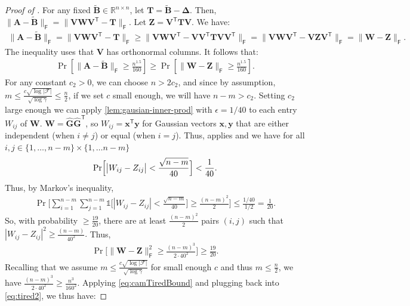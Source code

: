 \documentclass{article}[11pt]
\theoremstyle{definition}
\newcommand{\ones}{\mathds{1}}
\newcommand{\bv}[1]{\boldsymbol{\mathbf{#1}}}
\newcommand{\R}{\mathbb{R}}
\newcommand{\T}{\mathsf{T}}
\newcommand{\Fro}{\mathsf{F}}
\newcommand{\F}{\mathcal{F}}
\begin{document}
\begin{proof}[Proof of ]
For any fixed $\bv{\tilde B} \in \R^{n \times n}$, let $\bv{T}=\bv{\tilde B}-\bv{\Delta}$. Then, $\|\bv A - \bv{\tilde B}\|_\Fro = \| \bv{V}\bv{W}\bv{V}^\T -\bv T \|_\Fro$.
Let $\bv Z= \bv V^\T \bv T \bv V $. We have:
\begin{align*}
\|\bv A - \bv{\tilde B}\|_\Fro =
    \|\bv{V}\bv{W}\bv{V}^\T -\bv T \|_\Fro \geq \| \bv{V}\bv{W}\bv{V}^\T -\bv V \bv V^\T \bv T \bv V  \bv V^\T\|_\Fro = \| \bv{V}\bv{W}\bv{V}^\T -\bv V \bv Z \bv V^\T\|_\Fro
    = \|\bv W - \bv Z \|_\Fro.
\end{align*}
The inequality uses that $\bv V$ has orthonormal columns. It follows that:
\begin{align}\label{eq:camTiredBound}
    \Pr \left [\|\bv A - \bv{\tilde B}\|_\Fro \geq \frac{n^{1.5}}{160} \right ] \geq \Pr \left [\| \bv{W} -\bv Z \|_\Fro \geq \frac{n^{1.5}}{160} \right].
\end{align}
For any constant $c_2 > 0$, we can choose $n > 2 c_2$, and since by assumption, $m \le \frac{c \sqrt{\log |\F|}}{\sqrt{\log \gamma}} \le \frac{n}{2}$, if we set $c$ small enough, we will have $n-m > c_2$. Setting $c_2$ large enough we can apply \cref{lem:gausian-inner-prod} with $\epsilon = 1/40$ to each entry $W_{ij}$ of $\bv W$. $\bv W = \widehat{\bv G} \widehat{\bv G}^\T$, so $W_{ij} = \bv x^\T \bv y$ for Gaussian vectors $\bv x,\bv y$ that are either independent (when $i \neq j$) or equal (when $i =j$). Thus,  applies and we have for all $i,j \in \{1,\ldots,n-m\} \times \{1,\ldots n-m\}$
\begin{align*}
    \Pr\Bigl[ \big| W_{ij} - Z_{ij} \big| < \frac{\sqrt{n-m}}{40} \Bigr] < \frac{1}{40}.
\end{align*}
Thus, by Markov's inequality, 
\begin{align*}
        \Pr\Biggl[ \sum_{i=1}^{n -m} \sum_{j=1}^{n-m} \ones\Big[| W_{ij} - Z_{ij} | < \frac{\sqrt{n-m}}{40} \Big] 
        \geq \frac{(n-m)^2}{2} \Biggr] 
        \leq \frac{1/40}{1/2} =\frac{1}{20}.
\end{align*}
So, with probability $\ge \frac{19}{20}$, there are at least $\frac{(n-m)^2}{2}$ pairs $(i,j)$ such that $| W_{ij} - Z_{ij} |^2 \geq \frac{({n-m})}{40^2}.$
Thus,
\begin{align}\label{eq:tired2}
    \Pr\bigg[ \big\| \bv{W} -\bv Z \big\|_\Fro^2 \geq \frac{(n-m)^3}{2 \cdot 40^2}\bigg] \geq \frac{19}{20}.
\end{align}
Recalling that we assume $m \le \frac{c \sqrt{\log |\F|}}{\sqrt{\log \gamma}}$ for small enough $c$ and thus $m \le \frac{n}{2}$, we have $\frac{(n-m)^3}{2 \cdot 40^2} \ge \frac{n^3}{160^2}$. Applying  \eqref{eq:camTiredBound} and plugging back into \eqref{eq:tired2}, we thus have:

\end{proof}
\end{document}
